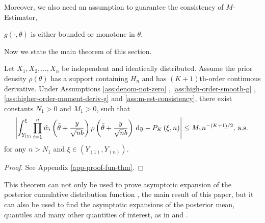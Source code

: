 Moreover, we also need an assumption to guarantee the consistency of $M$-Estimator,
\begin{assumption}
\label{ass:m-est-consistency}
$g\left(\cdot,\theta\right)$ is either bounded or monotone in $\theta$.
\end{assumption} 
Now we state the main theorem of this section.
\begin{theorem}
\label{thm:main-thm}Let $X_{1},X_{2},\ldots,X_{n}$ be independent and identically distributed.   %
Assume the prior density $\rho\left(\theta\right)$ has a support containing
$H_n$ and has $\left(K+1\right)$th-order continuous derivative. Under Assumptions \ref{ass:denom-not-zero} , \ref{ass:high-order-smooth-g} ,\ref{ass:higher-order-moment-deriv-g} and \ref{ass:m-est-consistency},  there
exist constants $N_{1}>0$ and $M_{1}>0$, such that 
\begin{equation}
\left|\int_{Y_{\left(1\right)}}^{\xi}\prod_{i=1}^{n}\hat{w}_{i}\left(\tilde{\theta}+\frac{y}{\sqrt{n}b}\right)\rho\left(\tilde{\theta}+\frac{y}{\sqrt{n}b}\right)\,\mathrm{d} y-P_{K}\left(\xi,n\right)\right|\le M_{1}n^{-\left(K+1\right)/2},\,\mathrm{a.s.}\,\label{eq:fund-exp-formula}
\end{equation}
for any $n>N_{1}$ and $\xi\in\left(Y_{\left(1\right)},Y_{\left(n\right)}\right)$. \end{theorem}
\begin{proof}
See Appendix \ref{app-proof-fun-thm}.
\end{proof}
This theorem can not only be used to prove asymptotic expansion of
the posterior cumulative distribution function , the main result of this
paper, but it can also be used to find the asymptotic expansions of the
posterior mean, quantiles and many other quantities of interest, as in \cite{johnson1970asymptotic}
and \cite{vexler2014posterior} . 

